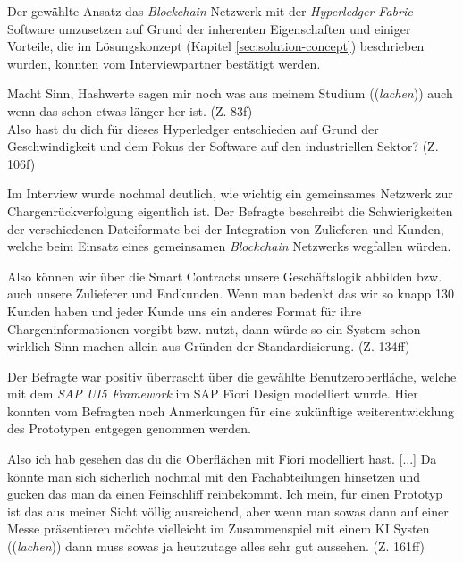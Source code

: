Der gewählte Ansatz das \textit{Blockchain} Netzwerk mit der \textit{Hyperledger Fabric} Software umzusetzen auf Grund der inherenten Eigenschaften und einiger Vorteile, die im Lösungskonzept (Kapitel \ref{sec:solution-concept}) beschrieben wurden, konnten vom Interviewpartner bestätigt werden.

\begin{displayquote}
    \glqq Macht Sinn, Hashwerte sagen mir noch was aus meinem Studium ((\textit{lachen})) auch wenn das schon etwas länger her ist.\grqq{} (Z. 83f)\\
    \glqq Also hast du dich für dieses Hyperledger entschieden auf Grund der Geschwindigkeit und dem Fokus der Software auf den industriellen Sektor?\grqq{} (Z. 106f)
\end{displayquote}

Im Interview wurde nochmal deutlich, wie wichtig ein gemeinsames Netzwerk zur Chargenrückverfolgung eigentlich ist. Der Befragte beschreibt die Schwierigkeiten der verschiedenen Dateiformate bei der Integration von Zulieferen und Kunden, welche beim Einsatz eines gemeinsamen \textit{Blockchain} Netzwerks wegfallen würden.

\begin{displayquote}
    \glqq Also können wir über die Smart Contracts unsere Geschäftslogik abbilden bzw. auch unsere Zulieferer und Endkunden. Wenn man bedenkt das wir so knapp 130 Kunden haben und jeder Kunde uns ein anderes Format für ihre Chargeninformationen vorgibt bzw. nutzt, dann würde so ein System schon wirklich Sinn machen allein aus Gründen der Standardisierung.\grqq{} (Z. 134ff)
\end{displayquote}

Der Befragte war positiv überrascht über die gewählte Benutzeroberfläche, welche mit dem \textit{SAP UI5 Framework} im SAP Fiori Design modelliert wurde. Hier konnten vom Befragten noch Anmerkungen für eine zukünftige weiterentwicklung des Prototypen entgegen genommen werden.

\begin{displayquote}
    \glqq Also ich hab gesehen das du die Oberflächen mit Fiori modelliert hast. [...] Da könnte man sich sicherlich nochmal mit den Fachabteilungen hinsetzen und gucken das man da einen Feinschliff reinbekommt. Ich mein, für einen Prototyp ist das aus meiner Sicht völlig ausreichend, aber wenn man sowas dann auf einer Messe präsentieren möchte vielleicht im Zusammenspiel mit einem KI Systen ((\textit{lachen})) dann muss sowas ja heutzutage alles sehr gut aussehen.\grqq{} (Z. 161ff)
\end{displayquote}

